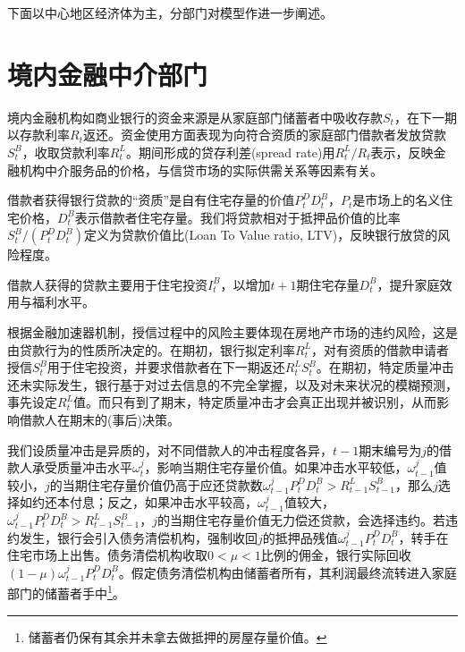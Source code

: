 下面以中心地区经济体为主，分部门对模型作进一步阐述。

\section{境内金融中介部门}
\label{sec:housing-domestic-fin-intm}
境内金融机构如商业银行的资金来源是从家庭部门储蓄者中吸收存款$S_{t}$，在下一期以存款利率$R_{t}$返还。资金使用方面表现为向符合资质的家庭部门借款者发放贷款$S_{t}^{B}$，收取贷款利率$R_{t}^{L}$。期间形成的贷存利差(spread rate)用$R_{t}^{L}/R_{t}$表示，反映金融机构中介服务品的价格，与信贷市场的实际供需关系等因素有关。



借款者获得银行贷款的``资质''是自有住宅存量的价值$P_{t}^{D} D_{t}^{B}$，$P_{t}$是市场上的名义住宅价格，$D_{t}^{B}$表示借款者住宅存量。我们将贷款相对于抵押品价值的比率$S_{t}^{B} / \left( P_{t}^{D} D_{t}^{B} \right)$定义为贷款价值比(Loan To Value ratio, LTV)，反映银行放贷的风险程度。

借款人获得的贷款主要用于住宅投资$I_{t}^{B}$，以增加$t+1$期住宅存量$D_{t}^{B}$，提升家庭效用与福利水平。


根据金融加速器机制，授信过程中的风险主要体现在房地产市场的违约风险，这是由贷款行为的性质所决定的。在期初，银行拟定利率$R_{t}^{L}$，对有资质的借款申请者授信$S_{t}^{B}$用于住宅投资，并要求借款者在下一期返还$R_{t}^{L} S_t^{B}$。在期初，特定质量冲击还未实际发生，银行基于对过去信息的不完全掌握，以及对未来状况的模糊预测，事先设定$R_{t}^{L}$值。而只有到了期末，特定质量冲击才会真正出现并被识别，从而影响借款人在期末的(事后)决策。

我们设质量冲击是异质的，对不同借款人的冲击程度各异，$t-1$期末编号为$j$的借款人承受质量冲击水平$\omega_{t}^{j}$，影响当期住宅存量价值。如果冲击水平较低，$\omega_{t-1}^{j}$值较小，$j$的当期住宅存量价值仍高于应还贷款数$\omega_{t-1}^{j} P_{t}^{D} D_{t}^{B} > R_{t-1}^{L} S_{t-1}^{B}$，那么$j$选择如约还本付息；反之，如果冲击水平较高，$\omega_{t-1}^{j}$值较大，$\omega_{t-1}^{j} P_{t}^{D} D_{t}^{B} > R_{t-1}^{L} S_{t-1}^{B}$，$j$的当期住宅存量价值无力偿还贷款，会选择违约。若违约发生，银行会引入债务清偿机构，强制收回$j$的抵押品残值$\omega_{t-1}^{j} P_{t}^{D} D_{t}^{B}$，转手在住宅市场上出售。债务清偿机构收取$0 < \mu < 1$比例的佣金，银行实际回收$\left( 1 - \mu \right) \omega_{t-1}^{j} P_{t}^{D} D_{t}^{B}$。假定债务清偿机构由储蓄者所有，其利润最终流转进入家庭部门的储蓄者手中\footnote{储蓄者仍保有其余并未拿去做抵押的房屋存量价值\citep{Suh:2012dp}。}。

